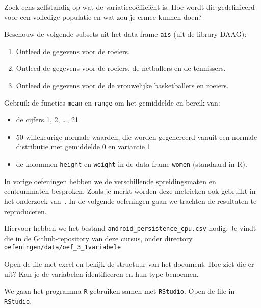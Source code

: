 \begin{exercise}
Zoek eens zelfstandig op wat de variatieco\"effici\"ent is. Hoe
wordt die gedefinieerd voor een volledige populatie en wat zou
je ermee kunnen doen?
\end{exercise}

\begin{exercise}
Beschouw de volgende subsets uit het data frame \texttt{ais} (uit de library DAAG):
\begin{enumerate}
\item Ontleed de gegevens voor de roeiers.
\item Ontleed de gegevens voor de roeiers, de netballers en de tennissers.
\item Ontleed de gegevens voor de de vrouwelijke basketballers en roeiers.
\end{enumerate}
\end{exercise}

\begin{exercise}
Gebruik de functies \texttt{mean}  en \texttt{range} om het gemiddelde en bereik van:
\begin{itemize}
  \item de cijfers 1, 2, \dots, 21 
  \item 50 willekeurige normale waarden, die  worden gegenereerd vanuit een normale distributie met gemiddelde 0 en variantie 1
  \item de kolommen \texttt{height} en \texttt{weight} in de data frame \texttt{women} (standaard in R).
\end{itemize}
\end{exercise}

In vorige oefeningen hebben we de verschillende spreidingsmaten en centrummaten besproken. Zoals je merkt worden deze metrieken ook gebruikt in het onderzoek van~\textcite{Akin2016}. In de volgende oefeningen gaan we trachten de resultaten te reproduceren.

Hiervoor hebben we het bestand \texttt{android\_persistence\_cpu.csv} nodig. Je vindt die in de Github-repository van deze cursus, onder directory \texttt{oefeningen/data/oef\_3\_1variabele}

\begin{exercise}
  \label{oef:casus-akin2016-1var}
	Open de file met excel en bekijk de structuur van het document. Hoe ziet die er uit? Kan je de variabelen identificeren en hun type benoemen. 
\end{exercise}

We gaan het programma \texttt{R} gebruiken samen met \texttt{RStudio}. Open de file in \texttt{RStudio}.

